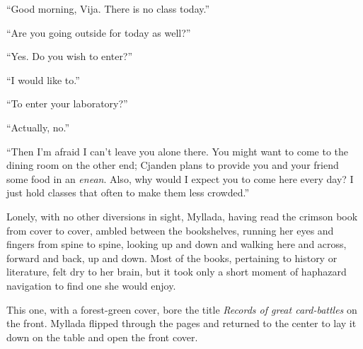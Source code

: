 ``Good morning, Vija. There is no class today.''

``Are you going outside for today as well?''

``Yes. Do you wish to enter?''

``I would like to.''

``To enter your laboratory?''

``Actually, no.''

``Then I'm afraid I can't leave you alone there. You might want to come to the dining room on the other end; Cjanden plans to provide you and your friend some food in an \emph{enean}. Also, why would I expect you to come here every day? I just hold classes that often to make them less crowded.''

Lonely, with no other diversions in sight, Myllada, having read the crimson book from cover to cover, ambled between the bookshelves, running her eyes and fingers from spine to spine, looking up and down and walking here and across, forward and back, up and down. Most of the books, pertaining to history or literature, felt dry to her brain, but it took only a short moment of haphazard navigation to find one she would enjoy.

This one, with a forest-green cover, bore the title \emph{Records of great card-battles} on the front. Myllada flipped through the pages and returned to the center to lay it down on the table and open the front cover.

